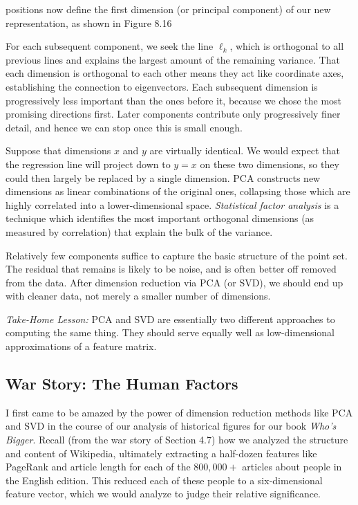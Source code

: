 \documentclass[10pt]{article}
\begin{document}
\noindent
positions now define the first dimension (or principal component) of our new representation, as shown in Figure 8.16

For each subsequent component, we seek the line $\ell_{k}$, which is orthogonal to all previous lines and explains the largest amount of the remaining variance. That each dimension is orthogonal to each other means they act like coordinate axes, establishing the connection to eigenvectors. Each subsequent dimension is progressively less important than the ones before it, because we chose the most promising directions first. Later components contribute only progressively finer detail, and hence we can stop once this is small enough.

Suppose that dimensions $x$ and $y$ are virtually identical. We would expect that the regression line will project down to $y=x$ on these two dimensions, so they could then largely be replaced by a single dimension. PCA constructs new dimensions as linear combinations of the original ones, collapsing those which are highly correlated into a lower-dimensional space. \textit{Statistical factor analysis} is a technique which identifies the most important orthogonal dimensions (as measured by correlation) that explain the bulk of the variance.

Relatively few components suffice to capture the basic structure of the point set. The residual that remains is likely to be noise, and is often better off removed from the data. After dimension reduction via PCA (or SVD), we should end up with cleaner data, not merely a smaller number of dimensions.

\textit{Take-Home Lesson:} PCA and SVD are essentially two different approaches to computing the same thing. They should serve equally well as low-dimensional approximations of a feature matrix.

\subsection{War Story: The Human Factors}
I first came to be amazed by the power of dimension reduction methods like PCA and SVD in the course of our analysis of historical figures for our book \textit{Who's Bigger}. Recall (from the war story of Section 4.7) how we analyzed the structure and content of Wikipedia, ultimately extracting a half-dozen features like PageRank and article length for each of the $800,000+$ articles about people in the English edition. This reduced each of these people to a six-dimensional feature vector, which we would analyze to judge their relative significance.
\end{document}
